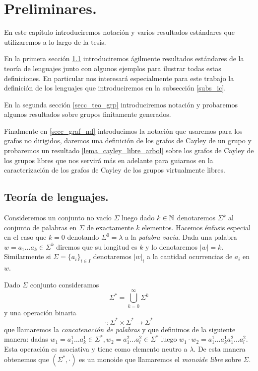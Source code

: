 \documentclass[tesis.tex]{subfiles}
\begin{document}
\chapter{Preliminares.}


En este capítulo introduciremos notación y varios resultados estándares que utilizaremos a lo largo de la tesis.

En la primera sección \ref{secc_tlen} introduciremos ágilmente resultados estándares de la teoría de lenguajes junto con algunos ejemplos para ilustrar todas estas definiciones.
En particular nos interesará especialmente para este trabajo la definición de los lenguajes \ic que introduciremos en la subsección \ref{subs_ic}. 


En la segunda sección \ref{secc_teo_grp} introduciremos notación y probaremos algunos resultados  sobre grupos finitamente generados. 


Finalmente en \ref{secc_graf_nd} introducimos la notación que usaremos para los grafos no dirigidos, daremos una definición de los grafos de Cayley de un grupo y probaremos un resultado \ref{lema_cayley_libre_arbol} sobre los grafos de Cayley de los grupos libres que nos servirá más en adelante para guiarnos en la caracterización de los grafos de Cayley de los grupos virtualmente libres.


\section{Teoría de lenguajes.}\label{secc_tlen}	


Consideremos un conjunto no vacío $\Sigma$ luego dado $k \in \mathbb{N}$ denotaremos $\Sigma^k$ al conjunto de palabras en $\Sigma$ de exactamente $k$ elementos.
Hacemos énfasis especial en el caso que $k=0$ denotando $\Sigma^0 = \lambda$ a la \emph{palabra vacía}.
Dada una palabra $w= a_1 \dots a_k \in \Sigma^k$ diremos que su longitud es $k$ y lo denotaremos $|w| = k$. 
Similarmente si $ \Sigma = \{ a_{i} \}_{i \in I} $ denotaremos $|w|_{i}$ a la cantidad ocurrencias de $a_{i}$ en $w$.



\begin{deff}
	Dado $\Sigma$ conjunto consideramos
	\begin{equation*}
		\Sigma^{*} = \bigcup_{k=0}^{\infty} \Sigma^k
	\end{equation*}
	y una operación binaria
	\[
		\cdot: \Sigma^{*} \times \Sigma^{*} \to \Sigma^{*}
	\]
	que llamaremos la \emph{concatenación de palabras} y que definimos de la siguiente manera: 
	dadas $w_1=a_{1}^1 \dots a_{k}^1 \in \Sigma^{*}, w_2 = a_{1}^{2} \dots a_{l}^{2} \in \Sigma^{*}$ luego $w_1 \cdot w_2 = a_{1}^1 \dots a_{k}^1 a_{1}^{2} \dots a_{l}^{2} $.
	Esta operación es asociativa y tiene como elemento neutro a $\lambda$.
	De esta manera obtenemos que $(\Sigma^{*}, \cdot)$ es un monoide que llamaremos el \emph{monoide libre} sobre $\Sigma$.
\end{deff}
\end{document}

